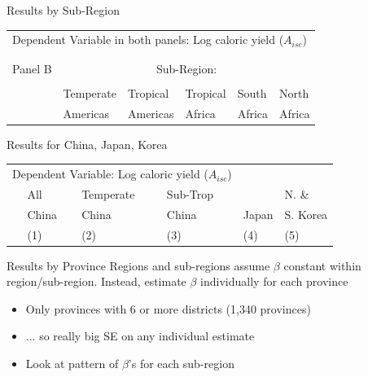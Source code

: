 \documentclass[10pt, xcolor=dvipsnames]{beamer}
\begin{document}
\begin{frame}{Results by Sub-Region}

{\scriptsize
\begin{tabularx}{\textwidth}{lXXXXX}
\midrule
\multicolumn{6}{l}{Dependent Variable in both panels: Log caloric yield ($A_{isc}$)} \\ \\
\\
Panel B & \multicolumn{5}{c}{Sub-Region:} \\ \cmidrule{2-6}
 &           &   &           &          &             \\
 & Temperate & Tropical  & Tropical & South    & North    \\
 & Americas  & Americas  & Africa   & Africa   & Africa     \\
\midrule

\midrule
\end{tabularx}
}

\end{frame}

\begin{frame}{Results for China, Japan, Korea}

{\scriptsize
\begin{tabularx}{\textwidth}{lXXXXX}
\midrule
\multicolumn{4}{l}{Dependent Variable: Log caloric yield ($A_{isc}$)} \\
 & All& Temperate & Sub-Trop & & N. \& \\
 & China & China  & China & Japan & S. Korea  \\
 & (1) & (2) & (3) & (4) & (5) \\
\midrule

\midrule
\end{tabularx}
}

\end{frame}

\begin{frame}{Results by Province}
Regions and sub-regions assume $\beta$ constant within region/sub-region. Instead, estimate $\beta$ individually for each province
\begin{itemize}
  \item Only provinces with 6 or more districts (1,340 provinces)
  \item ... so really big SE on any individual estimate
  \item Look at pattern of $\beta$'s for each sub-region
\end{itemize}
\end{frame}
\end{document}

